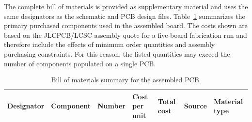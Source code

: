 The complete bill of materials is provided as supplementary material and uses 
the same designators as the schematic and PCB design files. 
Table~\ref{tab:bom_summary} summarizes the primary purchased components used 
in the assembled board. 
The costs shown are based on the JLCPCB/LCSC assembly quote for a five-board 
fabrication run and therefore include the effects of 
minimum order quantities and assembly purchasing constraints. 
For this reason, the listed quantities may exceed the number of components 
populated on a single PCB.

\begin{table}[h]
\centering
\caption{Bill of materials summary for the assembled PCB.}
\label{tab:bom_summary}
\small
\begin{tabular}{|p{2.2cm}|p{3.2cm}|p{1.2cm}|p{2.0cm}|p{2.0cm}|p{2.2cm}|p{1.8cm}|}
\hline
\textbf{Designator} & \textbf{Component} & \textbf{Number} & \textbf{Cost per unit} & \textbf{Total cost} & \textbf{Source} & \textbf{Material type} \\\hline


\end{tabular}
\end{table}
